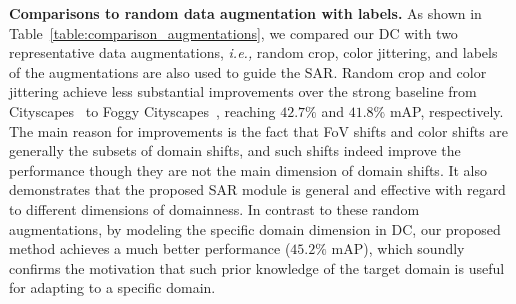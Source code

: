 \documentclass[10pt,journal,compsoc]{IEEEtran}
\begin{document}
\noindent \textbf{Comparisons to random data augmentation with labels.}  
As shown in Table~\ref{table:comparison_augmentations}, we compared our DC with two representative data augmentations, \emph{i.e.,} random crop, color jittering, and labels of the augmentations are also used to guide the SAR. Random crop and color jittering achieve less substantial improvements over the strong baseline from Cityscapes~\cite{cordts2016cityscapes} to Foggy Cityscapes~\cite{FoggyCity}, reaching $42.7\%$ and $41.8\%$ mAP, respectively. The main reason for improvements is the fact that FoV shifts and color shifts are generally the subsets of domain shifts, and such shifts indeed improve the performance though they are not the main dimension of domain shifts. It also demonstrates that the proposed SAR module is general and effective with regard to different dimensions of domainness. In contrast to these random augmentations, by modeling the specific domain dimension in DC, our proposed method achieves a much better performance ($45.2\%$ mAP), which soundly confirms the motivation that such prior knowledge of the target domain is useful for adapting to a specific domain.



\begin{table}[t]
\caption{
Comparison to data augmentations with labels. 
}
\centering
{}
\end{table}
\end{document}
